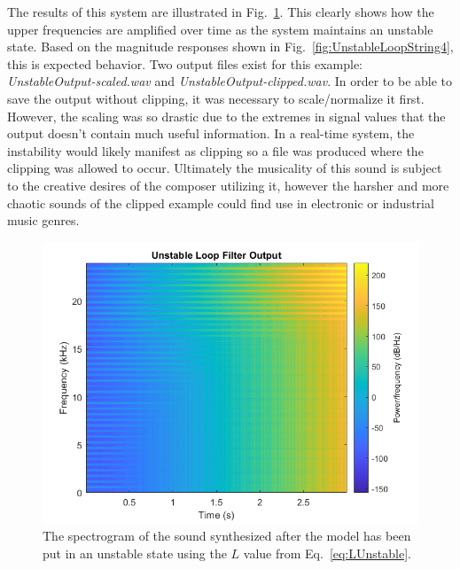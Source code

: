 \documentclass[../main.tex]{subfiles}
\begin{document}
The results of this system are illustrated in Fig.~\ref{fig:UnstableLoop}. This clearly shows how the upper frequencies are amplified over time as the system maintains an unstable state. Based on the magnitude responses shown in Fig.~\ref{fig:UnstableLoopString4}, this is expected behavior. Two output files exist for this example: \emph{UnstableOutput-scaled.wav} and \emph{UnstableOutput-clipped.wav}. In order to be able to save the output without clipping, it was necessary to scale/normalize it first. However, the scaling was so drastic due to the extremes in signal values that the output doesn't contain much useful information. In a real-time system, the instability would likely manifest as clipping so a file was produced where the clipping was allowed to occur. Ultimately the musicality of this sound is subject to the creative desires of the composer utilizing it, however the harsher and more chaotic sounds of the clipped example could find use in electronic or industrial music genres.

\begin{figure}[h]
    \centering
    \includegraphics[scale=.65]{./images/plots/UnstableLoopFilter.png}
    \caption{The spectrogram of the sound synthesized after the model has been put in an unstable state using the $L$ value from Eq.~\ref{eq:LUnstable}.}
    \label{fig:UnstableLoop}
\end{figure}
\end{document}
